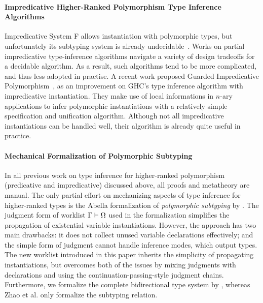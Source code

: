 \paragraph{Impredicative Higher-Ranked Polymorphism Type Inference Algorithms}
Impredicative System F allows instantiation with polymorphic types,
but unfortunately its subtyping system is already undecidable~\cite{tiuryn1996subtyping}.
Works on partial impredicative type-inference algorithms\cite{le2003ml,leijen2008hmf,vytiniotis2008fph}
navigate a variety of design tradeoffs for a decidable algorithm.
As a result, such algorithms tend to be more complicated, and thus less adopted in practise.
A recent work proposed Guarded Impredicative Polymorphism~\cite{Serrano2018},
as an improvement on GHC's type inference algorithm with impredicative instantiation.
They make use of local informations in $n$-ary applications to
infer polymorphic instantiations with a relatively simple specification and unification algorithm.
Although not all impredicative instantiations can be handled well,
their algorithm is already quite useful in practice.

\paragraph{Mechanical Formalization of Polymorphic Subtyping}
In all previous work on type inference for higher-ranked polymorphism
(predicative and impredicative) discussed above, all proofs and
metatheory are manual. The only partial effort on mechanizing aspects of type inference
for higher-ranked types is
the Abella formalization of \emph{polymorphic subtyping} by \citet{itp2018}.
The judgment form of worklist $\Gamma \vdash \Omega$ used in the formalization simplifies
the propagation of existential variable instantiations.
However, the approach has two main drawbacks:
it does not collect unused variable declarations effectively;
and the simple form of judgment cannot handle inference modes, which output types.
The new worklist introduced in this paper inherits the simplicity of propagating instantiations,
but overcomes both of the issues by mixing judgments with declarations
and using the continuation-passing-style judgment chains. Furthermore,
we formalize the complete bidirectional type system by
\citet{dunfield2013complete}, whereas Zhao et al. only formalize
the subtyping relation. 

